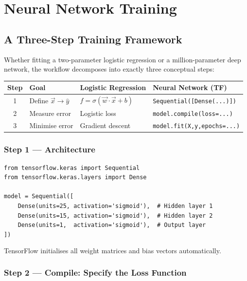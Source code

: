 \chapter{Neural Network Training}

\section{A Three-Step Training Framework}

Whether fitting a two-parameter logistic regression or a million-parameter deep
network, the workflow decomposes into exactly three conceptual steps:

\begin{center}
\begin{tabular}{clll}
\toprule
\textbf{Step} & \textbf{Goal} & \textbf{Logistic Regression} &
\textbf{Neural Network (TF)}\\
\midrule
1 & Define $\vec{x}\to\hat{y}$ & $f=\sigma(\vec{w}\cdot\vec{x}+b)$ &
\texttt{Sequential([Dense(...)])}\\
2 & Measure error & Logistic loss & \texttt{model.compile(loss=...)}\\
3 & Minimise error & Gradient descent & \texttt{model.fit(X,y,epochs=...)}\\
\bottomrule
\end{tabular}
\end{center}

\subsection{Step 1 --- Architecture}

\begin{lstlisting}[caption={Binary digit classifier: 3-layer network}]
from tensorflow.keras import Sequential
from tensorflow.keras.layers import Dense

model = Sequential([
    Dense(units=25, activation='sigmoid'),  # Hidden layer 1
    Dense(units=15, activation='sigmoid'),  # Hidden layer 2
    Dense(units=1,  activation='sigmoid'),  # Output layer
])
\end{lstlisting}
TensorFlow initialises all weight matrices and bias vectors automatically.

\subsection{Step 2 --- Compile: Specify the Loss Function}

